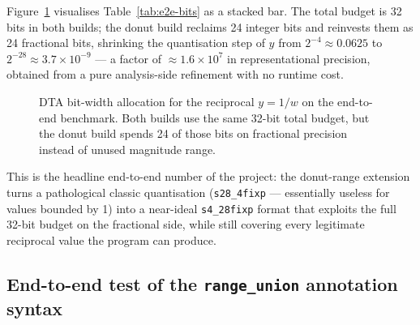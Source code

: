 \documentclass[11pt,a4paper]{article}
\theoremstyle{plain}
\begin{document}
Figure~\ref{fig:e2e-stacked} visualises Table~\ref{tab:e2e-bits} as a
stacked bar. The total budget is 32 bits in both builds; the donut
build reclaims 24 integer bits and reinvests them as 24 fractional
bits, shrinking the quantisation step of $y$ from $2^{-4}\approx 0.0625$
to $2^{-28}\approx 3.7\times 10^{-9}$ --- a factor of
$\approx 1.6\times 10^{7}$ in representational precision,
obtained from a pure analysis-side refinement with no runtime cost.

\begin{figure}[H]
\centering
{}
\caption{DTA bit-width allocation for the reciprocal $y=1/w$ on the
end-to-end benchmark. Both builds use the same 32-bit total budget,
but the donut build spends 24 of those bits on fractional precision
instead of unused magnitude range.}
\label{fig:e2e-stacked}
\end{figure}

This is the headline end-to-end number of the project: the donut-range
extension turns a pathological classic quantisation
(\texttt{s28\_4fixp} --- essentially useless for values bounded by 1)
into a near-ideal \texttt{s4\_28fixp} format that exploits the full
32-bit budget on the fractional side, while still covering every
legitimate reciprocal value the program can produce.

\subsection{End-to-end test of the \texttt{range\_union} annotation syntax}
\label{sec:range-union-eval}
\end{document}
